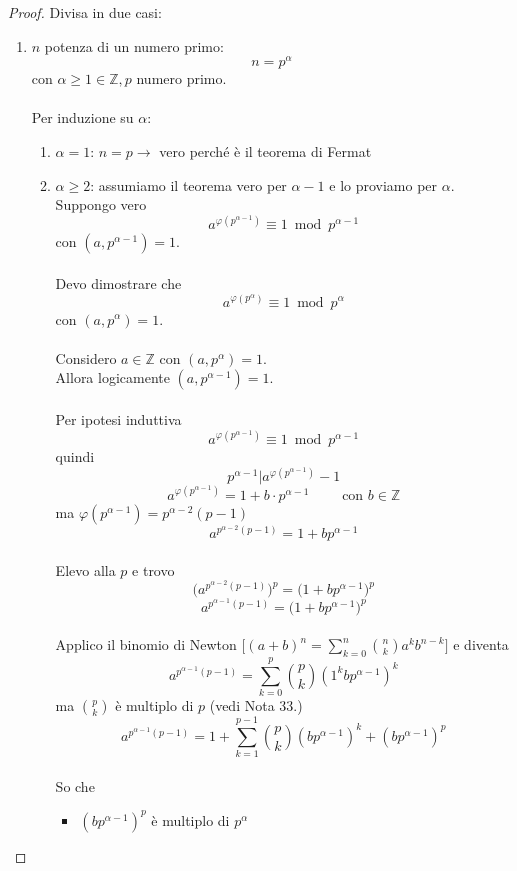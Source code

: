 \documentclass[a4paper,12pt, oneside]{book}
\begin{document}
\begin{teorema}
				\begin{proof}
					Divisa in due casi:
					\begin{enumerate}
						\item $n$ potenza di un numero primo: $$n=p^\alpha$$ con $\alpha \geq 1 \in \mathbb{Z}, p$ numero primo.\\\\
							Per induzione su $\alpha$: \begin{enumerate}[label=\Roman*) ]
								\item $\alpha = 1$: $n=p \rightarrow $ vero perché è il teorema di Fermat
								\item $\alpha \geq 2$: assumiamo il teorema vero per $\alpha-1$ e lo proviamo per $\alpha$.\\
									Suppongo vero
									$$a^{\varphi(p^{\alpha-1})} \equiv 1 \bmod p^{\alpha-1}$$
									con $(a, p^{\alpha-1}) = 1$.\\\\
									Devo dimostrare che
									$$a^{\varphi(p^{\alpha})} \equiv 1 \bmod p^{\alpha}$$
									con $(a, p^{\alpha}) = 1$.\\\\
									Considero $a \in \mathbb{Z}$ con $(a,p^\alpha) = 1$.\\
									Allora logicamente $(a,p^{\alpha-1}) = 1$.\\\\
									Per ipotesi induttiva
									$$a^{\varphi(p^{\alpha-1})} \equiv 1 \bmod p^{\alpha-1}$$
									quindi
									$$p^{\alpha-1} | a^{\varphi(p^{\alpha-1})}-1$$
									$$a^{\varphi(p^{\alpha-1})} = 1 + b \cdot p^{\alpha-1} \qquad \mbox{ con } b \in \mathbb{Z}$$
									ma $\varphi(p^{\alpha-1}) = p^{\alpha-2}(p-1)$
									$$a^{p^{\alpha-2} (p-1)} = 1+bp^{\alpha-1}$$\\
									Elevo alla $p$ e trovo
									$$\Big( a^{p^{\alpha-2} (p-1)} \Big)^p = \Big( 1+bp^{\alpha-1} \Big)^p$$
									$$a^{p^{\alpha-1} (p-1)} = \Big( 1+bp^{\alpha-1} \Big)^p$$\\
									Applico il binomio di Newton $\Big[ (a+b)^n = \sum_{k=0}^{n} \binom{n}{k} a^{k} b^{n-k} \Big]$ e diventa
									$$a^{p^{\alpha-1} (p-1)} = \sum_{k=0}^{p} \binom{p}{k} (1^k b p^{\alpha-1})^k$$
									ma $\binom{p}{k}$ è multiplo di $p$ (vedi Nota 33.)
									$$a^{p^{\alpha-1} (p-1)} = 1 + \sum_{k=1}^{p-1} \binom{p}{k} (b p^{\alpha-1})^k + (bp^{\alpha-1})^p$$\\
									So che \begin{itemize}
										\item $(bp^{\alpha-1})^p$ è multiplo di $p^\alpha$

\end{itemize}
\end{enumerate}
\end{enumerate}
\end{proof}
\end{teorema}
\end{document}
